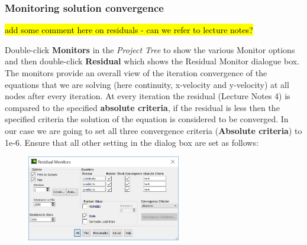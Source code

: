 \documentclass[11pt,a4paper,oneside,hidelinks]{scrartcl}
\newcommand\bfr[1]{\textcolor[rgb]{1,0.00,0.00}{\textbf{\textsf{#1}}}}
\begin{document}
\subsubsection{Monitoring solution convergence}
\hl{add some comment here on residuals - can we refer to lecture notes?}

Double-click \bfr{Monitors} in the \emph{Project Tree} to show the various Monitor options and then double-click \bfr{Residual} which shows the Residual Monitor dialogue box. The monitors provide an overall view of the iteration convergence of the equations that we are solving (here continuity, x-velocity and y-velocity) at all nodes after every iteration. At every iteration the residual (Lecture Notes 4) is compared to the specified \bfr{absolute criteria}, if the residual is less then the specified criteria the solution of the equation is considered to be converged. In our case we are going to set all three convergence criteria (\bfr{Absolute criteria}) to 1e-6. Ensure that all other setting in the dialog box are set as follows:
\begin{figure}[H]
\begin{center}
\includegraphics[width=0.6\textwidth,clip]{convergence_criteria.png}
\end{center}
\end{figure}
\end{document}
